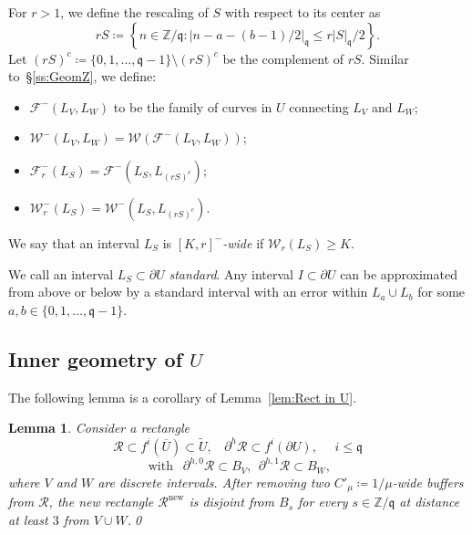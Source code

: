 \documentclass{amsart}
\renewcommand{\sp}{{\ \ }}
\newcommand{\1}{{\mathbb 1 }}
\newcommand{\Fam}{{\mathcal F}}
\newcommand{\Width}{{\mathcal W}}
\newcommand{\epscasc}{{\mu}}
\newcommand\RR{\mathcal{R}}
\newcommand{\qq}{\mathfrak{q}}
\newcommand\ovl{\overline}
\newcommand\new{{\operatorname{new}}}
\newcommand{\Z}{\mathbb{Z}}
\newtheorem{lem}[thm]{Lemma}
\theoremstyle{remark}
\numberwithin{equation}{section}
\theoremstyle{definition}
\begin{document}
For $r>1$, we define the rescaling of $S$ with respect to its center as
\[ r S \coloneqq  \left\{n\in \Z/\qq :  \left| n- a -(b-1)/2\right|_\qq \le r|S|_\qq/2 \right\}.\]
Let $(rS)^c \coloneqq \{0,1,\dots, \qq-1\} \setminus (rS)^c$ be the complement of $rS$. Similar to~\S\ref{ss:GeomZ}, we define:
\begin{itemize}
\item $\Fam^-(L_V,L_W)$ to be the family of curves in $U$ connecting $L_V$ and $L_W$;
\item $\Width^-(L_V,L_W)=\Width(\Fam^-(L_V,L_W))$;
\item $\Fam^-_r(L_S)=\Fam^-(L_S, L_{(rS)^c})$;
\item $\Width^-_r(L_S)=\Width^-(L_S, L_{(rS)^c})$.
\end{itemize} 
We say that an interval $L_S$ is \emph{$[K,r]^-$-wide} if $\Width_r(L_S)\ge K$. 

We call an interval $L_S\subset \partial U$ \emph{standard}. Any interval $ I\subset \partial U$ can be approximated from above or below by a standard interval with an error within $L_a\cup L_b$ for some $a,b \in \{0,1,\dots, \qq-1\}$.

\subsection{Inner geometry of $U$} The following lemma is a corollary of Lemma~\ref{lem:Rect in U}.


\begin{lem}
\label{lem:1/eps buffer}
Consider a rectangle
\[\RR\subset f^i(\ovl U)\subset\widetilde U,\sp\sp \partial ^h \RR\subset f^i(\partial U), \sp\sp \sp i\le \qq\]
\[\text{ with } \sp\partial^{h,0} \RR\subset B_V,\sp \partial^{h,1} \RR\subset B_W, 
\] where $V$ and $W$ are discrete intervals.  After removing two $C'_\epscasc\coloneqq 1/\epscasc$-wide buffers from $\RR$, the new rectangle $\RR^\new$ is disjoint from $B_s$ for every $s\in \Z/\qq$ at distance at least $3$ from $V\cup W$.\qed
\end{lem}
\end{document}
